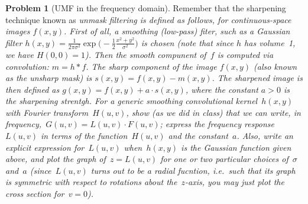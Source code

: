 \documentclass[11pt]{article}
\theoremstyle{plain}
\theoremstyle{definition}
\newtheorem{problem}{Problem}
\theoremstyle{remark}
\begin{document}
\begin{problem}[UMF in the  frequency domain]
Remember that the sharpening technique known as 
\em unmask filtering \em is defined as follows,
for continuous-space images $f(x,y)$.
First of all, a smoothing (low-pass) fiter, such as a 
Gaussian filter $h(x,y)=\frac{1}{2\pi\sigma^2}\exp\!
\big(\!-\!\frac{1}{2}\frac{x^2+y^2}{\sigma^2}\big)$
is chosen (note that since $h$ has volume~1, we have $H(0,0)=1$).
Then the smooth compunent of~$f$ is computed 
via convolution: $m=h\ast f$. The sharp component
of the image $f(x,y)$ (also known as the \em unsharp mask\em\/)
is $s(x,y)=f(x,y)-m(x,y)$. The sharpened image is then defined
as $g(x,y)=f(x,y)+a\cdot s(x,y)$, where the constant $a>0$ 
is the \em sharpening strentgh\em\/. For
a generic smoothing convolutional kernel~$h(x,y)$ with
Fourier transform~$H(u,v)$, show (as we did in class) 
that we can write, in frequency,~$G(u,v)=L(u,v)\cdot F(u,v)$;
express the frequency response~$L(u,v)$ in terms of the function~$H(u,v)$
and the constant~$a$. Also, write an explicit expression 
for~$L(u,v)$ when~$h(x,y)$ is the Gaussian function given above,
and plot the graph of~$z=L(u,v)$ for one or two particular choices of~$\sigma$ and~$a$ (since~$L(u,v)$ turns out to be a radial fucntion, i.e.~such that its graph is symmetric with respect
to rotations about the~$z$-axis, you may just plot the cross section for~$v=0$).
\end{problem}
\end{document}
